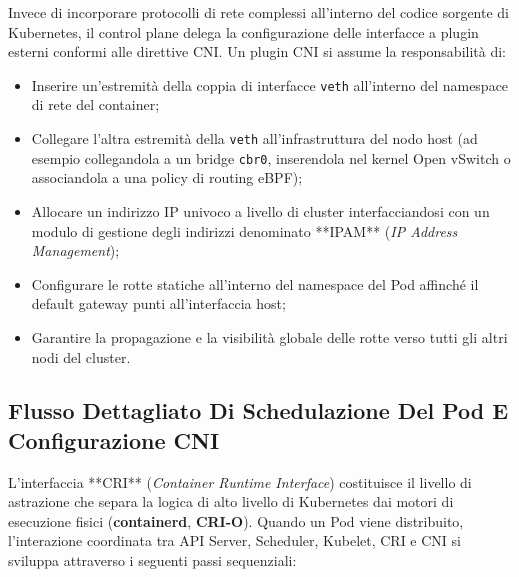 \documentclass[11pt, a4paper]{article}
\begin{document}
Invece di incorporare protocolli di rete complessi all'interno del codice sorgente di Kubernetes, il control plane delega la configurazione delle interfacce a plugin esterni conformi alle direttive CNI. Un plugin CNI si assume la responsabilità di:
\begin{itemize}[noitemsep]
    \item Inserire un'estremità della coppia di interfacce \texttt{veth} all'interno del namespace di rete del container;
    \item Collegare l'altra estremità della \texttt{veth} all'infrastruttura del nodo host (ad esempio collegandola a un bridge \texttt{cbr0}, inserendola nel kernel Open vSwitch o associandola a una policy di routing eBPF);
    \item Allocare un indirizzo IP univoco a livello di cluster interfacciandosi con un modulo di gestione degli indirizzi denominato **IPAM** (\emph{IP Address Management});
    \item Configurare le rotte statiche all'interno del namespace del Pod affinché il default gateway punti all'interfaccia host;
    \item Garantire la propagazione e la visibilità globale delle rotte verso tutti gli altri nodi del cluster.
\end{itemize}

\subsection{Flusso Dettagliato Di Schedulazione Del Pod E Configurazione CNI}

L'interfaccia **CRI** (\emph{Container Runtime Interface}) costituisce il livello di astrazione che separa la logica di alto livello di Kubernetes dai motori di esecuzione fisici (\textbf{containerd}, \textbf{CRI-O}). Quando un Pod viene distribuito, l'interazione coordinata tra API Server, Scheduler, Kubelet, CRI e CNI si sviluppa attraverso i seguenti passi sequenziali:
\end{document}
